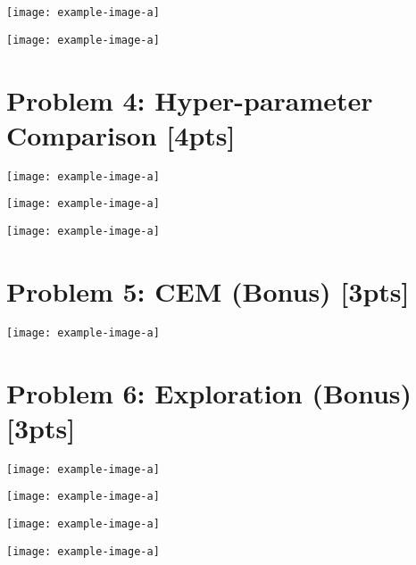 \documentclass{article}
\begin{document}
\begin{answer}[title=Plot 2,height=9.5cm,width=\linewidth]
\centering
\texttt{[image: example-image-a]}
\end{answer}

\begin{answer}[title=Plot 3,height=9.5cm,width=\linewidth]
\centering
\texttt{[image: example-image-a]}
\end{answer}

\section{Problem 4: Hyper-parameter Comparison [4pts]}
\begin{answer}[title=Plot 1,height=9.5cm,width=\linewidth]
\centering
\texttt{[image: example-image-a]}
\end{answer}


\begin{answer}[title=Plot 2,height=9.5cm,width=\linewidth]
\centering
\texttt{[image: example-image-a]}
\end{answer}

\begin{answer}[title=Plot 3,height=9.5cm,width=\linewidth]
\centering
\texttt{[image: example-image-a]}
\end{answer}

\section{Problem 5: CEM (Bonus) [3pts]}
\begin{answer}[title=Plot 1,height=9.5cm,width=\linewidth]
\centering
\texttt{[image: example-image-a]}
\end{answer}

\section{Problem 6: Exploration (Bonus) [3pts]}
\begin{answer}[title=Plot 1,height=9.5cm,width=\linewidth]
\centering
\texttt{[image: example-image-a]}
\end{answer}

\begin{answer}[title=Plot 2,height=9.5cm,width=\linewidth]
\centering
\texttt{[image: example-image-a]}
\end{answer}

\begin{answer}[title=Plot 3,height=9.5cm,width=\linewidth]
\centering
\texttt{[image: example-image-a]}
\end{answer}

\begin{answer}[title=Plot 4,height=9.5cm,width=\linewidth]
\centering
\texttt{[image: example-image-a]}
\end{answer}
\end{document}
